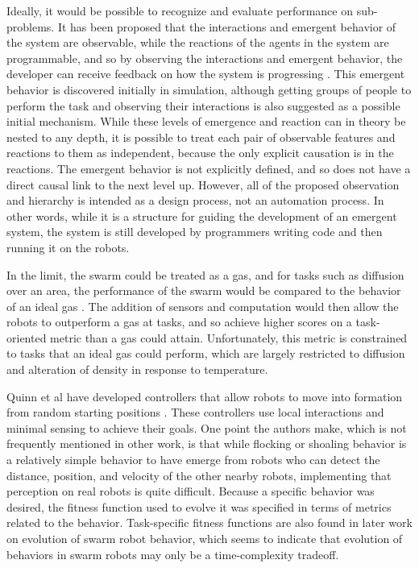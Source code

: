 \documentclass[]{article}
\begin{document}
Ideally, it would be possible to recognize and evaluate performance on sub-problems. 
It has been proposed that the interactions and emergent behavior of the system are observable, while the reactions of the agents in the system are programmable, and so by observing the interactions and emergent behavior, the developer can receive feedback on how the system is progressing \cite{palmer2005behavioral}. 
This emergent behavior is discovered initially in simulation, although getting groups of people to perform the task and observing their interactions is also suggested as a possible initial mechanism.
While these levels of emergence and reaction can in theory be nested to any depth, it is possible to treat each pair of observable features and reactions to them as independent, because the only explicit causation is in the reactions. 
The emergent behavior is not explicitly defined, and so does not have a direct causal link to the next level up. 
However, all of the proposed observation and hierarchy is intended as a design process, not an automation process. 
In other words, while it is a structure for guiding the development of an emergent system, the system is still developed by programmers writing code and then running it on the robots.

In the limit, the swarm could be treated as a gas, and for tasks such as diffusion over an area, the performance of the swarm would be compared to the behavior of an ideal gas \cite{jantz1997kinetics}.
The addition of sensors and computation would then allow the robots to outperform a gas at tasks, and so achieve higher scores on a task-oriented metric than a gas could attain. 
Unfortunately, this metric is constrained to tasks that an ideal gas could perform, which are largely restricted to diffusion and alteration of density in response to temperature. 

Quinn et al have developed controllers that allow robots to move into formation from random starting positions \cite{quinn2003evolving}. 
These controllers use local interactions and minimal sensing to achieve their goals. 
One point the authors make, which is not frequently mentioned in other work, is that while flocking or shoaling behavior is a relatively simple behavior to have emerge from robots who can detect the distance, position, and velocity of the other nearby robots, implementing that perception on real robots is quite difficult.
Because a specific behavior was desired, the fitness function used to evolve it was specified in terms of metrics related to the behavior. 
Task-specific fitness functions are also found in later work on evolution of swarm robot behavior, which seems to indicate that evolution of behaviors in swarm robots may only be a time-complexity tradeoff. 
\end{document}
